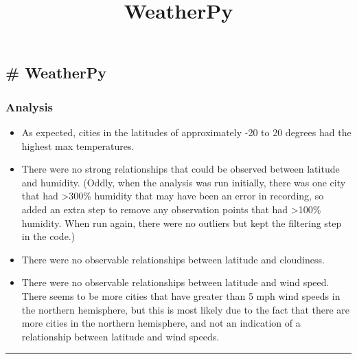 \documentclass[11pt]{article}
\title{WeatherPy}
\providecommand{\tightlist}{%
      \setlength{\itemsep}{0pt}\setlength{\parskip}{0pt}}
\begin{document}
    
    
    \maketitle
    
    

    
    \hypertarget{weatherpy}{%
\subsection{\# WeatherPy}\label{weatherpy}}

\hypertarget{analysis}{%
\subsubsection{Analysis}\label{analysis}}

\begin{itemize}
\tightlist
\item
  As expected, cities in the latitudes of approximately -20 to 20
  degrees had the highest max temperatures.
\item
  There were no strong relationships that could be observed between
  latitude and humidity. (Oddly, when the analysis was run initially,
  there was one city that had \textgreater{}300\% humidity that may have
  been an error in recording, so added an extra step to remove any
  observation points that had \textgreater{}100\% humidity. When run
  again, there were no outliers but kept the filtering step in the
  code.)
\item
  There were no observable relationships between latitude and
  cloudiness.
\item
  There were no observable relationships between latitude and wind
  speed. There seems to be more cities that have greater than 5 mph wind
  speeds in the northern hemisphere, but this is most likely due to the
  fact that there are more cities in the northern hemisphere, and not an
  indication of a relationship between latitude and wind speeds.
\end{itemize}

\begin{center}\rule{0.5\linewidth}{\linethickness}\end{center}
\end{document}
